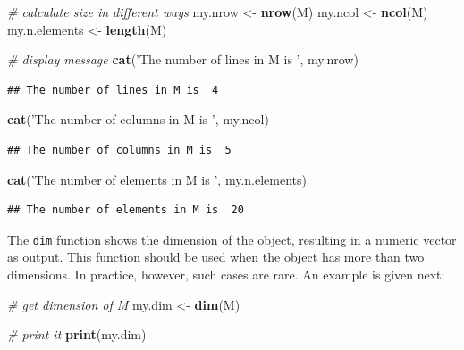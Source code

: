 \documentclass[11pt,]{book}
\newenvironment{Shaded}{\begin{snugshade}}{\end{snugshade}}
\newcommand{\KeywordTok}[1]{\textcolor[rgb]{0.27,0.27,0.27}{\textbf{#1}}}
\newcommand{\StringTok}[1]{\textcolor[rgb]{0.5,0.5,0.5}{#1}}
\newcommand{\CommentTok}[1]{\textcolor[rgb]{0.56,0.35,0.01}{\textit{#1}}}
\newcommand{\NormalTok}[1]{#1}
\begin{document}
\begin{Shaded}
\begin{Highlighting}[]
\CommentTok{# calculate size in different ways}
\NormalTok{my.nrow <-}\StringTok{ }\KeywordTok{nrow}\NormalTok{(M)}
\NormalTok{my.ncol <-}\StringTok{ }\KeywordTok{ncol}\NormalTok{(M)}
\NormalTok{my.n.elements <-}\StringTok{ }\KeywordTok{length}\NormalTok{(M)}

\CommentTok{# display message }
\KeywordTok{cat}\NormalTok{(}\StringTok{'The number of lines in M is '}\NormalTok{, my.nrow)}
\end{Highlighting}
\end{Shaded}

\begin{verbatim}
## The number of lines in M is  4
\end{verbatim}

\begin{Shaded}
\begin{Highlighting}[]
\KeywordTok{cat}\NormalTok{(}\StringTok{'The number of columns in M is '}\NormalTok{, my.ncol)}
\end{Highlighting}
\end{Shaded}

\begin{verbatim}
## The number of columns in M is  5
\end{verbatim}

\begin{Shaded}
\begin{Highlighting}[]
\KeywordTok{cat}\NormalTok{(}\StringTok{'The number of elements in M is '}\NormalTok{, my.n.elements)}
\end{Highlighting}
\end{Shaded}

\begin{verbatim}
## The number of elements in M is  20
\end{verbatim}

The \texttt{dim} function shows the dimension of the object, resulting
in a numeric vector as output. This function should be used when the
object has more than two dimensions. In practice, however, such cases
are rare. An example is given next:

\begin{Shaded}
\begin{Highlighting}[]
\CommentTok{# get dimension of M}
\NormalTok{my.dim <-}\StringTok{ }\KeywordTok{dim}\NormalTok{(M)}

\CommentTok{# print it}
\KeywordTok{print}\NormalTok{(my.dim)}
\end{Highlighting}
\end{Shaded}
\end{document}
